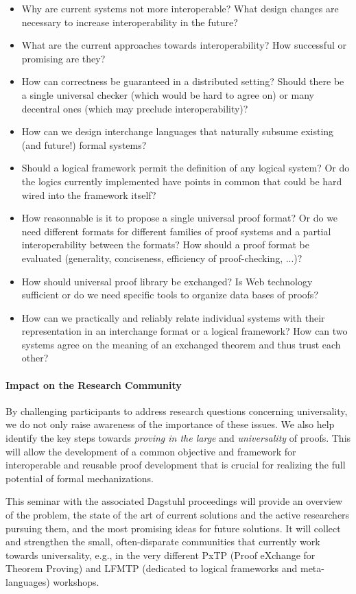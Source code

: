 \begin{itemize}
\item Why are current systems not more interoperable? What design changes are necessary to increase interoperability in the future?
\item What are the current approaches towards interoperability? How successful or promising are they?
\item How can correctness be guaranteed in a distributed setting?
 Should there be a single universal checker (which would be hard to agree on) or many decentral ones (which may preclude interoperability)?
\item How can we design interchange languages that naturally subsume
  existing (and future!) formal systems?
\item Should a logical framework permit the definition of any logical system?
Or do the logics currently implemented have points in common that could
be hard wired into the framework itself?
\item How reasonnable is it to propose a single universal proof format?
Or do we need different formats for different families of
proof systems and a partial interoperability between the formats?
 How should a proof format be evaluated (generality, conciseness,
efficiency of proof-checking, ...)?
\item How should universal proof library be exchanged? Is Web technology
sufficient or do we need specific tools to organize data bases of
proofs?
\item How can we practically and reliably relate individual systems with their representation in an interchange format or a logical framework?
How can two systems agree on the meaning of an exchanged theorem and thus trust each other?
\end{itemize}

\paragraph{Impact on the Research Community}
By challenging participants to address research questions concerning
universality, we do not only raise awareness of the importance of these issues.
We also help identify the key steps towards \emph{proving in the large} and  \emph{universality} of proofs.
This will allow the development of a common objective and framework for interoperable and reusable proof development that is crucial for realizing the full potential of formal mechanizations.

This seminar with the associated Dagstuhl proceedings will provide an overview of the problem, the state of the art of current solutions and the active researchers pursuing them, and the most promising ideas for future solutions.
It will collect and strengthen the small, often-disparate communities that currently work towards universality, e.g., in the very different PxTP (Proof eXchange for Theorem Proving) and LFMTP (dedicated to logical frameworks and meta-languages) workshops.

